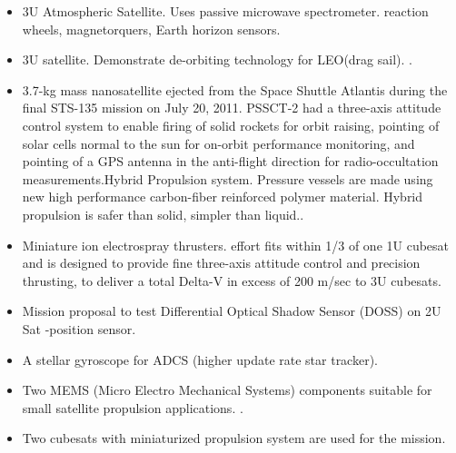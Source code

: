 %
%
%
%
%

\begin{itemize}
\item 3U Atmospheric Satellite. Uses passive microwave spectrometer.  reaction wheels, magnetorquers, Earth horizon sensors\cite{Ref:Blackwell12}. 

\item 3U satellite. Demonstrate de-orbiting technology for LEO(drag sail). \cite{Ref:Shmuel12}. 

\item 3.7-kg mass nanosatellite ejected from the Space Shuttle Atlantis during the final STS-135 mission on July 20, 2011. PSSCT-2 had a three-axis attitude control system to enable firing of solid rockets for orbit raising, pointing of solar cells normal to the sun for on-orbit performance monitoring, and pointing of a GPS antenna in the anti-flight direction for radio-occultation measurements.Hybrid Propulsion system. Pressure vessels are made using new high performance carbon-fiber reinforced polymer material. Hybrid propulsion is safer than solid, simpler than liquid.\cite{Ref:Janson12}.

\item Miniature ion electrospray thrusters. effort fits within 1/3 of one 1U cubesat and is designed to provide fine three-axis attitude control and precision thrusting, to deliver a total Delta-V in excess of 200 m/sec to 3U cubesats\cite{Ref:Dushku12}. 

\item Mission proposal to test Differential Optical Shadow Sensor (DOSS) on 2U Sat   -position sensor\cite{Ref:Martel12}. 

\item A stellar gyroscope for ADCS (higher update rate star tracker)\cite{Ref:Zoellner12}. 

\item Two MEMS (Micro Electro Mechanical Systems) components suitable for small satellite propulsion applications. \cite{Ref:Rawashdeh12}. 
\item Two cubesats with miniaturized propulsion system are used for the mission\cite{Ref:Sundaramoorthy10}. 


\end{itemize}
